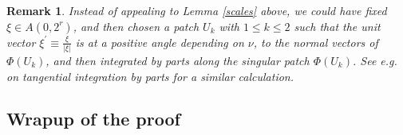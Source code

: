 \documentclass{amsart}%
\theoremstyle{plain}
\newtheorem{remark}[theorem]{Remark}
\numberwithin{equation}{section}
\begin{document}
\begin{remark}
Instead of appealing to Lemma \ref{scales} above, we could have fixed $\xi\in
A\left(  0,2^{r}\right)  $, and then chosen a patch $U_{k}$ with $1\leq
k\leq2$ such that the unit vector $\xi^{\prime}\equiv\frac{\xi}{\left\vert
\xi\right\vert }$ is at a positive angle depending on $\nu$, to the normal
vectors of $\Phi\left(  U_{k}\right)  $, and then integrated by parts along
the singular patch $\Phi\left(  U_{k}\right)  $. See e.g. \cite[Subsubsection
4.2.4]{Saw7} on tangential integration by parts for a similar calculation.
\end{remark}

\subsection{Wrapup of the proof}
\end{document}
